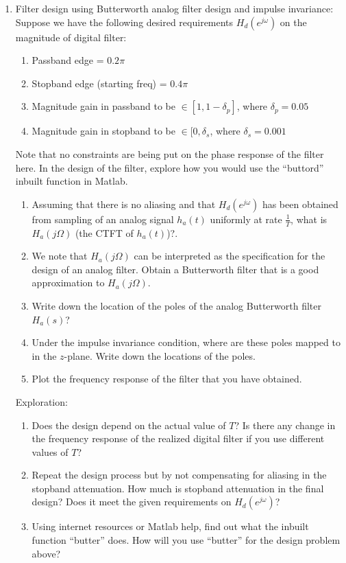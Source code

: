 \begin{enumerate}
\item Filter design using Butterworth analog filter design and impulse invariance: Suppose we have the following desired requirements $H_{d}(e^{j\omega})$ on the magnitude of digital filter:
  \begin{enumerate}
  \item Passband edge = $0.2\pi$
  \item Stopband edge (starting freq) = $0.4\pi$
  \item Magnitude gain in passband to be $\in [1, 1 - \delta_{p}]$, where $\delta_{p} = 0.05$
  \item Magnitude gain in stopband to be $\in [0, \delta_{s}$, where $\delta_{s} = 0.001$
  \end{enumerate}
  Note that no constraints are being put on the phase response of the filter here. In the design of the filter, explore how you would use the ``buttord'' inbuilt function in Matlab.
  \begin{enumerate}
  \item Assuming that there is no aliasing and that $H_{d}(e^{j\omega})$ has been obtained from sampling of an analog signal $h_{a}(t)$ uniformly at rate $\frac{1}{T}$, what is $H_{a}(j\Omega)$ (the CTFT of $h_{a}(t)$)?.
  \item We note that $H_{a}(j\Omega)$ can be interpreted as the specification for the design of an analog filter. Obtain a Butterworth filter that is a good approximation to $H_{a}(j\Omega)$.
  \item Write down the location of the poles of the analog Butterworth filter $H_{a}(s)$? 
  \item Under the impulse invariance condition, where are these poles mapped to in the $z$-plane. Write down the locations of the poles.
  \item Plot the frequency response of the filter that you have obtained.
  \end{enumerate}
  Exploration:
  \begin{enumerate}
  \item Does the design depend on the actual value of $T$? Is there any change in the frequency response of the realized digital filter if you use different values of $T$?
  \item Repeat the design process but by not compensating for aliasing in the stopband attenuation. How much is stopband attenuation in the final design? Does it meet the given requirements on $H_{d}(e^{j\omega})$?
  \item Using internet resources or Matlab help, find out what the inbuilt function ``butter'' does. How will you use ``butter'' for the design problem above?

\end{enumerate}
\end{enumerate}
